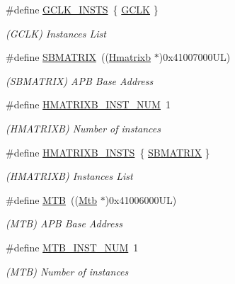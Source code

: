 \begin{DoxyCompactItemize}
\#define \mbox{\hyperlink{group___s_a_m_d21_e15_l__base_gaa628d67bafdc0077c685b79f3344decb}{G\+C\+L\+K\+\_\+\+I\+N\+S\+TS}}~\{ \mbox{\hyperlink{group___s_a_m_d21_j18_a__base_ga23f9186cfd6ee5e60c8485315183271f}{G\+C\+LK}} \}
\begin{DoxyCompactList}\small\item\em (G\+C\+LK) Instances List \end{DoxyCompactList}\item 
\#define \mbox{\hyperlink{group___s_a_m_d21_e15_l__base_ga9036739dd33ab6ada3129dcd7789af2b}{S\+B\+M\+A\+T\+R\+IX}}~((\mbox{\hyperlink{struct_hmatrixb}{Hmatrixb}} $\ast$)0x41007000\+U\+L)
\begin{DoxyCompactList}\small\item\em (S\+B\+M\+A\+T\+R\+IX) A\+PB Base Address \end{DoxyCompactList}\item 
\#define \mbox{\hyperlink{group___s_a_m_d21_e15_l__base_gacdd3c27438c6bf468cf3e4cc2cbe2798}{H\+M\+A\+T\+R\+I\+X\+B\+\_\+\+I\+N\+S\+T\+\_\+\+N\+UM}}~1
\begin{DoxyCompactList}\small\item\em (H\+M\+A\+T\+R\+I\+XB) Number of instances \end{DoxyCompactList}\item 
\#define \mbox{\hyperlink{group___s_a_m_d21_e15_l__base_ga3f70e157160178c48c7f7c1aafb3151d}{H\+M\+A\+T\+R\+I\+X\+B\+\_\+\+I\+N\+S\+TS}}~\{ \mbox{\hyperlink{group___s_a_m_d21_j18_a__base_ga9036739dd33ab6ada3129dcd7789af2b}{S\+B\+M\+A\+T\+R\+IX}} \}
\begin{DoxyCompactList}\small\item\em (H\+M\+A\+T\+R\+I\+XB) Instances List \end{DoxyCompactList}\item 
\#define \mbox{\hyperlink{group___s_a_m_d21_e15_l__base_ga09636f7f0071f50666d5747d44c6b94e}{M\+TB}}~((\mbox{\hyperlink{struct_mtb}{Mtb}}      $\ast$)0x41006000\+U\+L)
\begin{DoxyCompactList}\small\item\em (M\+TB) A\+PB Base Address \end{DoxyCompactList}\item 
\#define \mbox{\hyperlink{group___s_a_m_d21_e15_l__base_ga9ab4175347e0c210cf409140367a4066}{M\+T\+B\+\_\+\+I\+N\+S\+T\+\_\+\+N\+UM}}~1
\begin{DoxyCompactList}\small\item\em (M\+TB) Number of instances \end{DoxyCompactList}\item 

\end{DoxyCompactItemize}
